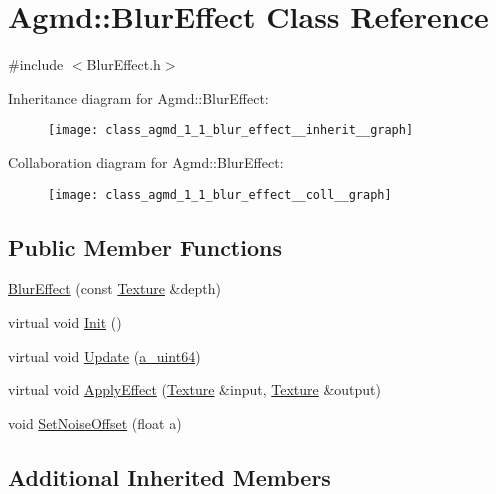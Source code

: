 \hypertarget{class_agmd_1_1_blur_effect}{\section{Agmd\+:\+:Blur\+Effect Class Reference}
\label{class_agmd_1_1_blur_effect}
}


{\ttfamily \#include $<$Blur\+Effect.\+h$>$}



Inheritance diagram for Agmd\+:\+:Blur\+Effect\+:\nopagebreak
\begin{figure}[H]
\begin{center}
\leavevmode
\texttt{[image: class\_agmd\_1\_1\_blur\_effect\_\_inherit\_\_graph]}
\end{center}
\end{figure}


Collaboration diagram for Agmd\+:\+:Blur\+Effect\+:\nopagebreak
\begin{figure}[H]
\begin{center}
\leavevmode
\texttt{[image: class\_agmd\_1\_1\_blur\_effect\_\_coll\_\_graph]}
\end{center}
\end{figure}
\subsection*{Public Member Functions}
\begin{DoxyCompactItemize}
\item 
\hyperlink{class_agmd_1_1_blur_effect_aec50410a2f44488dea7280d87b811391}{Blur\+Effect} (const \hyperlink{class_agmd_1_1_texture}{Texture} \&depth)
\item 
virtual void \hyperlink{class_agmd_1_1_blur_effect_a072b106d29c221ba95ef7fa03bd66d9a}{Init} ()
\item 
virtual void \hyperlink{class_agmd_1_1_blur_effect_a06b1dd244fec6e7ed24d436570db3f04}{Update} (\hyperlink{_common_defines_8h_a6c5192ec3c55d6e5b13d2dbaa082bdea}{a\+\_\+uint64})
\item 
virtual void \hyperlink{class_agmd_1_1_blur_effect_a5faf8cd49602dfc0b745b105d32c0e1f}{Apply\+Effect} (\hyperlink{class_agmd_1_1_texture}{Texture} \&input, \hyperlink{class_agmd_1_1_texture}{Texture} \&output)
\item 
void \hyperlink{class_agmd_1_1_blur_effect_ae460f1933ab68f297bcd5302ab8412a2}{Set\+Noise\+Offset} (float a)
\end{DoxyCompactItemize}
\subsection*{Additional Inherited Members}


